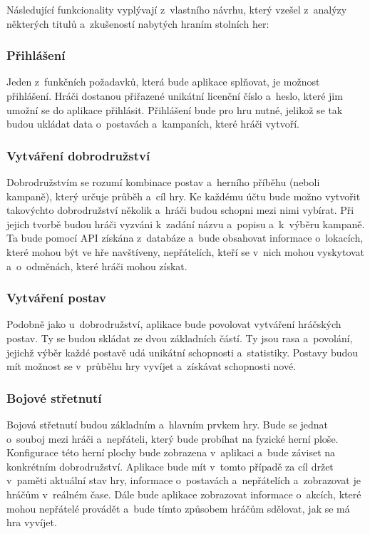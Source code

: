 Následující funkcionality vyplývají z~vlastního návrhu, který vzešel z~analýzy některých titulů a~zkušeností nabytých hraním stolních her:

\subsubsection*{Přihlášení}
Jeden z~funkčních požadavků, která bude aplikace splňovat, je možnost přihlášení. Hráči dostanou přiřazené unikátní licenční číslo a~heslo, které jim umožní se do aplikace přihlásit. Přihlášení bude pro hru nutné, jelikož se tak budou ukládat data o~postavách a~kampaních, které hráči vytvoří.

\subsubsection*{Vytváření dobrodružství}\label{sec:adventure}
Dobrodružstvím se rozumí kombinace postav a~herního příběhu (neboli kampaně), který určuje průběh a~cíl hry. Ke každému účtu bude možno vytvořit takovýchto dobrodružství několik a~hráči budou schopni mezi nimi vybírat. Při jejich tvorbě budou hráči vyzváni k~zadání názvu a~popisu a~k~výběru kampaně. Ta bude pomocí API získána z~databáze a~bude obsahovat informace o~lokacích, které mohou být ve hře navštíveny, nepřátelích, kteří se v~nich mohou vyskytovat a~o~odměnách, které hráči mohou získat.

\subsubsection*{Vytváření postav}
Podobně jako u~dobrodružství, aplikace bude povolovat vytváření hráčských postav. Ty se budou skládat ze dvou základních částí. Ty jsou rasa a~povolání, jejichž výběr každé postavě udá unikátní schopnosti a~statistiky. Postavy budou mít možnost se v~průběhu hry vyvíjet a~získávat schopnosti nové.

\subsubsection*{Bojové střetnutí}
Bojová střetnutí budou základním a~hlavním prvkem hry. Bude se jednat o~souboj mezi hráči a~nepřáteli, který bude probíhat na fyzické herní ploše. Konfigurace této herní plochy bude zobrazena v~aplikaci a~bude záviset na konkrétním dobrodružství. Aplikace bude mít v~tomto případě za cíl držet v~paměti aktuální stav hry, informace o~postavách a~nepřátelích a~zobrazovat je hráčům v~reálném čase. Dále bude aplikace zobrazovat informace o~akcích, které mohou nepřátelé provádět a~bude tímto způsobem hráčům sdělovat, jak se má hra vyvíjet.

